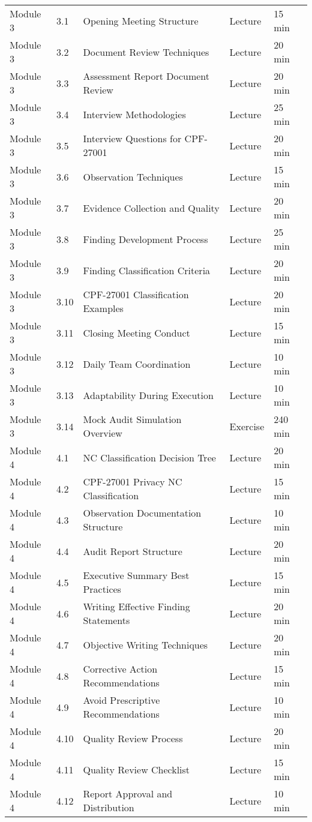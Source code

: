 \documentclass[11pt,a4paper]{article}
\begin{document}
\begin{longtable}{|p{2cm}|p{1cm}|p{7cm}|p{2cm}|p{1.5cm}|}
Module 3 & 3.1 & Opening Meeting Structure & Lecture & 15 min \\
Module 3 & 3.2 & Document Review Techniques & Lecture & 20 min \\
Module 3 & 3.3 & Assessment Report Document Review & Lecture & 20 min \\
Module 3 & 3.4 & Interview Methodologies & Lecture & 25 min \\
Module 3 & 3.5 & Interview Questions for CPF-27001 & Lecture & 20 min \\
Module 3 & 3.6 & Observation Techniques & Lecture & 15 min \\
Module 3 & 3.7 & Evidence Collection and Quality & Lecture & 20 min \\
Module 3 & 3.8 & Finding Development Process & Lecture & 25 min \\
Module 3 & 3.9 & Finding Classification Criteria & Lecture & 20 min \\
Module 3 & 3.10 & CPF-27001 Classification Examples & Lecture & 20 min \\
Module 3 & 3.11 & Closing Meeting Conduct & Lecture & 15 min \\
Module 3 & 3.12 & Daily Team Coordination & Lecture & 10 min \\
Module 3 & 3.13 & Adaptability During Execution & Lecture & 10 min \\
Module 3 & 3.14 & Mock Audit Simulation Overview & Exercise & 240 min \\
\hline

Module 4 & 4.1 & NC Classification Decision Tree & Lecture & 20 min \\
Module 4 & 4.2 & CPF-27001 Privacy NC Classification & Lecture & 15 min \\
Module 4 & 4.3 & Observation Documentation Structure & Lecture & 10 min \\
Module 4 & 4.4 & Audit Report Structure & Lecture & 20 min \\
Module 4 & 4.5 & Executive Summary Best Practices & Lecture & 15 min \\
Module 4 & 4.6 & Writing Effective Finding Statements & Lecture & 20 min \\
Module 4 & 4.7 & Objective Writing Techniques & Lecture & 20 min \\
Module 4 & 4.8 & Corrective Action Recommendations & Lecture & 15 min \\
Module 4 & 4.9 & Avoid Prescriptive Recommendations & Lecture & 10 min \\
Module 4 & 4.10 & Quality Review Process & Lecture & 20 min \\
Module 4 & 4.11 & Quality Review Checklist & Lecture & 15 min \\
Module 4 & 4.12 & Report Approval and Distribution & Lecture & 10 min \\
\hline


\end{longtable}
\end{document}
